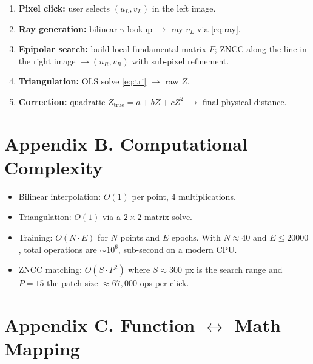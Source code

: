 \documentclass[11pt]{article}
\begin{document}
\begin{enumerate}[leftmargin=2em]
  \item \textbf{Pixel click:} user selects $(u_L, v_L)$ in the left image.
  \item \textbf{Ray generation:} bilinear $\gamma$ lookup $\to$ ray $v_L$ via \eqref{eq:ray}.
  \item \textbf{Epipolar search:} build local fundamental matrix $F$; ZNCC along the line
        in the right image $\to (u_R, v_R)$ with sub-pixel refinement.
  \item \textbf{Triangulation:} OLS solve \eqref{eq:tri} $\to$ raw $Z$.
  \item \textbf{Correction:} quadratic $Z_\text{true} = a + b Z + c Z^2$ $\to$ final
        physical distance.
\end{enumerate}

\section*{Appendix B. Computational Complexity}

\begin{itemize}[leftmargin=2em]
  \item Bilinear interpolation: $O(1)$ per point, 4 multiplications.
  \item Triangulation: $O(1)$ via a $2 \times 2$ matrix solve.
  \item Training: $O(N \cdot E)$ for $N$ points and $E$ epochs. With $N \approx 40$ and
        $E \leq 20000$, total operations are $\sim 10^6$, sub-second on a modern CPU.
  \item ZNCC matching: $O(S \cdot P^2)$ where $S \approx 300$ px is the search range and
        $P = 15$ the patch size $\approx 67{,}000$ ops per click.
\end{itemize}

\section*{Appendix C. Function $\leftrightarrow$ Math Mapping}
\end{document}
